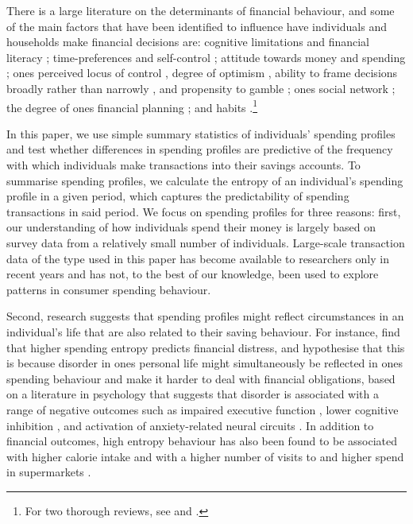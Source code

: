 There is a large literature on the determinants of financial behaviour, and
some of the main factors that have been identified to influence have
individuals and households make financial decisions are: cognitive limitations
and financial literacy \citep{agarwal2009age, agarwal2013cognitive,
    korniotis2011older, agarwal2010learning, fernandes2014financial,
    jorring2020financial}; time-preferences and self-control
    \citep{frederick2002time, read2018intertemporal, ericson2019intertemporal,
    cohen2020measuring}; attitude towards money and spending
    \citep{rick2008tightwads, rick2011fatal}; ones perceived locus of control
    \citep{perry2005control}, degree of optimism \citep{puri2007optimism},
    ability to frame decisions broadly rather than narrowly
    \citep{kumar2008decision}, and propensity to gamble
    \citep{kumar2009gambles}; ones social network \citep{bailey2018economic,
        kuchler2021social}; the degree of ones financial planning
        \citep{ameriks2003wealth}; and habits \citep{blumenstock2018defaults,
            schaner2018persistent, de2013deposit}.\footnote{For two thorough
        reviews, see \citet{agarwal2017shapes} and
    \citet{greenberg2019financial}.}

In this paper, we use simple summary statistics of individuals' spending
profiles and test whether differences in spending profiles are predictive of
the frequency with which individuals make transactions into their savings
accounts. To summarise spending profiles, we calculate the entropy of an
individual's spending profile in a given period, which captures the
predictability of spending transactions in said period. We focus on spending
profiles for three reasons: first, our understanding of how individuals spend
their money is largely based on survey data from a relatively small number of
individuals. Large-scale transaction data of the type used in this paper has
become available to researchers only in recent years and has not, to the best
of our knowledge, been used to explore patterns in consumer spending behaviour. 

Second, research suggests that spending profiles might reflect circumstances in
an individual's life that are also related to their saving behaviour. For
instance, \citet{muggleton2020evidence} find that higher spending entropy
predicts financial distress, and hypothesise that this is because disorder in
ones personal life might simultaneously be reflected in ones spending behaviour
and make it harder to deal with financial obligations, based on a literature in
psychology that suggests that disorder is associated with a range of negative
outcomes such as impaired executive function \citep{vernon2016predictors},
lower cognitive inhibition \citep{mittal2015cognitive}, and activation of
anxiety-related neural circuits \citep{hirsh2012psychological}. In addition to
financial outcomes, high entropy behaviour has also been found to be associated
with higher calorie intake \citep{skatova2019those} and with a higher number of
visits to and higher spend in supermarkets \citep{guidotti2015behavioral}.

